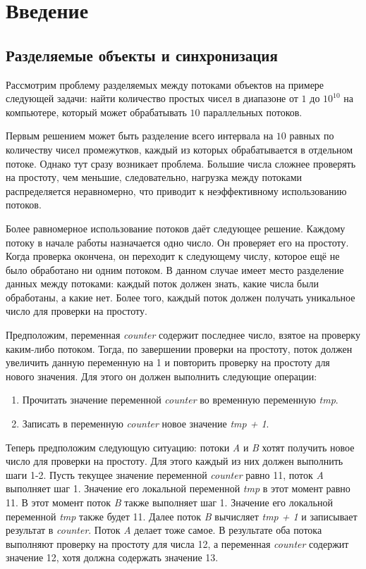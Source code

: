 \section{Введение}

\subsection{Разделяемые объекты и синхронизация}
\label{1-1}

Рассмотрим проблему разделяемых между потоками объектов на примере следующей
задачи: найти количество простых чисел в диапазоне от $1$ до $10^{10}$ на
компьютере, который может обрабатывать $10$ параллельных потоков.

Первым решением может быть разделение всего интервала на $10$ равных по
количеству чисел промежутков, каждый из которых обрабатывается в отдельном
потоке. Однако тут сразу возникает проблема. Большие числа сложнее проверять на
простоту, чем меньшие, следовательно, нагрузка между потоками распределяется
неравномерно, что приводит к неэффективному использованию потоков.

Более равномерное использование потоков даёт следующее решение. Каждому потоку в
начале работы назначается одно число. Он проверяет его на простоту. Когда
проверка окончена, он переходит к следующему числу, которое ещё не было
обработано ни одним потоком. В данном случае имеет место разделение данных между
потоками: каждый поток должен знать, какие числа были обработаны, а какие нет.
Более того, каждый поток должен получать уникальное число для проверки на
простоту.

Предположим, переменная \textit{counter} содержит последнее число, взятое на
проверку каким-либо потоком. Тогда, по завершении проверки на простоту, поток
должен увеличить данную переменную на 1 и повторить проверку на простоту для
нового значения. Для этого он должен выполнить следующие операции:

\begin{enumerate}
    \item Прочитать значение переменной \textit{counter} во временную
    переменную \textit{tmp}.
    \item Записать в переменную \textit{counter} новое значение
    \textit{tmp + 1}.
\end{enumerate}

Теперь предположим следующую ситуацию: потоки \textit{A} и \textit{B} хотят
получить новое число для проверки на простоту. Для этого каждый из них должен
выполнить шаги 1-2. Пусть текущее значение переменной \textit{counter} равно 11,
поток \textit{A} выполняет шаг 1. Значение его локальной переменной \textit{tmp}
в этот момент равно 11. В этот момент поток \textit{B} также выполняет шаг 1.
Значение его локальной переменной \textit{tmp} также будет 11. Далее поток
\textit{B} вычисляет \textit{tmp + 1} и записывает результат в \textit{counter}.
Поток \textit{A} делает тоже самое. В результате оба потока выполняют проверку
на простоту для числа 12, а переменная \textit{counter} содержит значение 12,
хотя должна содержать значение 13.

